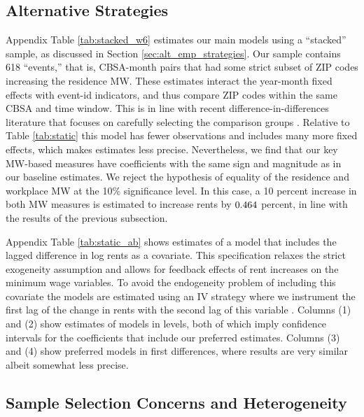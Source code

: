 \subsection{Alternative Strategies}
\label{sec:results_alternative_strategies}

Appendix Table \ref{tab:stacked_w6} estimates our main models using a 
``stacked'' sample, as discussed in Section \ref{sec:alt_emp_strategies}.
Our sample contains 618 ``events,'' that is, CBSA-month pairs that had some 
strict subset of ZIP codes increasing the residence MW.
These estimates interact the year-month fixed effects with event-id indicators, 
and thus compare ZIP codes within the same CBSA and time window.
This is in line with recent difference-in-differences literature that 
focuses on carefully selecting the comparison groups 
\parencite{CallawayEtAl2021, deChaisemartinEtAl2022, RothEtAl2022}.
Relative to Table \ref{tab:static} this model has fewer observations and includes 
many more fixed effects, which makes estimates less precise.
Nevertheless, we find that our key MW-based measures have coefficients with 
the same sign and magnitude as in our baseline estimates.
We reject the hypothesis of equality of the residence and workplace MW at the
10\% significance level.
In this case, a 10 percent increase in both MW measures is estimated to 
increase rents by $\textnormal{0.464}$ percent, in line with the results of the 
previous subsection.

Appendix Table \ref{tab:static_ab} shows estimates of a model that includes
the lagged difference in log rents as a covariate.
This specification relaxes the strict exogeneity assumption and allows for 
feedback effects of rent increases on the minimum wage variables.
To avoid the endogeneity problem of including this covariate the models are 
estimated using an IV strategy where we instrument the first lag of the change 
in rents with the second lag of this variable 
\parencite{ArellanoBond1991,ArellanoHonore2001}.
Columns (1) and (2) show estimates of models in levels, both of which imply
confidence intervals for the coefficients that include our preferred estimates.
Columns (3) and (4) show preferred models in first differences, where results
are very similar albeit somewhat less precise. 

\subsection{Sample Selection Concerns and Heterogeneity}
\label{sec:results_heterogeneity}

